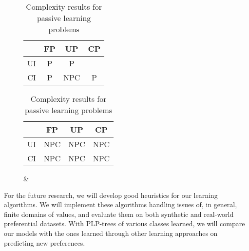 \begin{table}[!ht]
	\centering
  \begin{subfigure}[b]{0.45\textwidth}
		\centering
		\begin{tabular}[0.45\textwidth]{ | c | c | c | c | }
		  \hline
		     & FP & UP & CP \\
		  \hline
		  UI & P & P & \tit{NP}\\
		  \hline
		  CI & P & NPC & P  \\
		  \hline
		\end{tabular}
		\caption{}
		\label{tbl:cons_learn}
	\end{subfigure}%
  \begin{subfigure}[b]{0.45\textwidth}
		\centering
		\begin{tabular}[0.45\textwidth]{ | c | c | c | c | }
		  \hline
		     & FP & UP & CP \\
		  \hline
		  UI & NPC & NPC & NPC \\
		  \hline
		  CI & NPC & NPC & NPC \\
		  \hline
		\end{tabular}
		\caption{ \& }
		\label{tbl:small_max_learn}
	\end{subfigure}
	\caption{Complexity results for passive learning problems}
	\label{tbl:comp_results}
\end{table}

For the future research, we will develop good heuristics for our learning algorithms.
We will implement these algorithms handling issues of, in general, finite domains
of values, and evaluate them on both synthetic and
real-world preferential datasets. 
With PLP-trees of various classes learned, we will compare our models with
the ones learned through other learning approaches on predicting new preferences.
